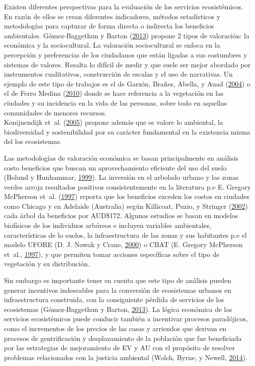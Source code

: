 \documentclass[12pt,a4paper,openany]{book}
\theoremstyle{definition}
\theoremstyle{definition}
\theoremstyle{definition}
\theoremstyle{remark}
\begin{document}
Existen diferentes perspectivas para la evaluación de los servicios
ecosistémicos. En razón de ellos se crean diferentes indicadores,
métodos estadísticos y metodologías para capturar de forma directa o
indirecta los beneficios ambientales. Gómez-Baggethun y Barton
(\protect\hyperlink{ref-gomez-baggethun_classifying_2013}{2013}) propone
2 tipos de valoración: la económica y la sociocultural. La valoración
sociocultural se enfoca en la percepción y preferencias de los
ciudadanos que están ligadas a sus costumbres y sistemas de valores.
Resalta lo difícil de medir y que suele ser mejor abordado por
instrumentos cualitativos, construcción de escalas y el uso de
narrativas. Un ejemplo de este tipo de trabajos es el de Garzón, Brañes,
Abella, y Auad (\protect\hyperlink{ref-garzon2004vegetacion}{2004}) o el
de Ferro Medina
(\protect\hyperlink{ref-ferro_medina_arboles_2010}{2010}) donde se hace
referencia a la vegetación en las ciudades y su incidencia en la vida de
las personas, sobre todo en aquellas comunidades de menores recursos.\\
Konijnendijk et~al.
(\protect\hyperlink{ref-konijnendijk_arboles_2005}{2005}) propone además
que se valore lo ambiental, la biodiversidad y sostenibilidad por su
carácter fundamental en la existencia misma del los ecosistemas.

Las metodologías de valoración económica se basan principalmente en
análisis costo beneficios que buscan un aprovechamiento eficiente del
uso del suelo (Bolund y Hunhammar,
\protect\hyperlink{ref-bolund_ecosystem_1999}{1999}). La inversión en el
arbolado urbano y las zonas verdes arroja resultados positivos
consistentemente en la literatura p.e E. Gregory McPherson et~al.
(\protect\hyperlink{ref-mcpherson_quantifying_1997}{1997}) reporta que
los beneficios exceden los costos en ciudades como Chicago y en Adelaide
(Australia) según Killicoat, Puzio, y Stringer
(\protect\hyperlink{ref-killicoat_economic_2002}{2002}) cada árbol da
beneficios por AUD\$172. Algunos estudios se basan en modelos biofísicos
de los individuos arbóreos e incluyen variables ambientales,
características de lo suelos, la infraestructura de las zonas y sus
habitantes p.e el modelo UFORE (D. J. Nowak y Crane,
\protect\hyperlink{ref-nowak_urban_2000}{2000}) o CBAT (E. Gregory
McPherson et~al.,
\protect\hyperlink{ref-mcpherson_quantifying_1997}{1997}), y que
permiten tomar acciones específicas sobre el tipo de vegetación y su
distribución.

Sin embargo es importante tener en cuenta que este tipo de análisis
pueden generar incentivos indeseables para la conversión de ecosistemas
urbanos en infraestructura construida, con la consiguiente pérdida de
servicios de los ecosistemas (Gómez-Baggethun y Barton,
\protect\hyperlink{ref-gomez-baggethun_classifying_2013}{2013}). La
lógica económica de los servicios ecosistémicos puede conducir también a
incentivar procesos paradójicos, como el incrementos de los precios de
las casas y arriendos que derivan en procesos de gentrificación y
desplazamiento de la población que fue beneficiada por las estrategias
de mejoramiento de EV y AU con el propósito de resolver problemas
relacionados con la justicia ambiental (Wolch, Byrne, y Newell,
\protect\hyperlink{ref-wolch_urban_2014}{2014}).
\end{document}

